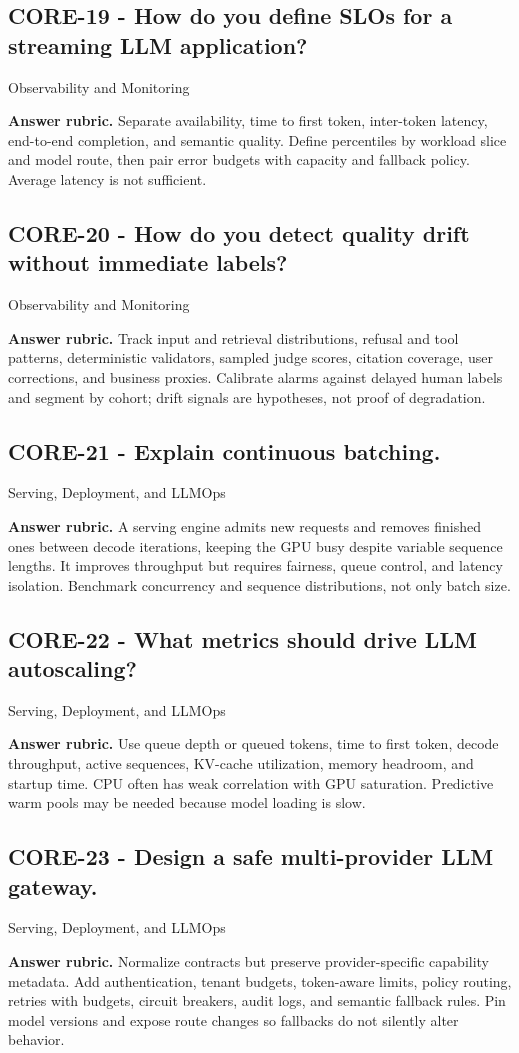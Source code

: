 \subsection*{CORE-19 - How do you define SLOs for a streaming LLM application?}
 \quad Observability and Monitoring
\par\smallskip\textbf{Answer rubric.} Separate availability, time to first token, inter-token latency, end-to-end completion, and semantic quality. Define percentiles by workload slice and model route, then pair error budgets with capacity and fallback policy. Average latency is not sufficient.
\subsection*{CORE-20 - How do you detect quality drift without immediate labels?}
 \quad Observability and Monitoring
\par\smallskip\textbf{Answer rubric.} Track input and retrieval distributions, refusal and tool patterns, deterministic validators, sampled judge scores, citation coverage, user corrections, and business proxies. Calibrate alarms against delayed human labels and segment by cohort; drift signals are hypotheses, not proof of degradation.
\subsection*{CORE-21 - Explain continuous batching.}
 \quad Serving, Deployment, and LLMOps
\par\smallskip\textbf{Answer rubric.} A serving engine admits new requests and removes finished ones between decode iterations, keeping the GPU busy despite variable sequence lengths. It improves throughput but requires fairness, queue control, and latency isolation. Benchmark concurrency and sequence distributions, not only batch size.
\subsection*{CORE-22 - What metrics should drive LLM autoscaling?}
 \quad Serving, Deployment, and LLMOps
\par\smallskip\textbf{Answer rubric.} Use queue depth or queued tokens, time to first token, decode throughput, active sequences, KV-cache utilization, memory headroom, and startup time. CPU often has weak correlation with GPU saturation. Predictive warm pools may be needed because model loading is slow.
\subsection*{CORE-23 - Design a safe multi-provider LLM gateway.}
 \quad Serving, Deployment, and LLMOps
\par\smallskip\textbf{Answer rubric.} Normalize contracts but preserve provider-specific capability metadata. Add authentication, tenant budgets, token-aware limits, policy routing, retries with budgets, circuit breakers, audit logs, and semantic fallback rules. Pin model versions and expose route changes so fallbacks do not silently alter behavior.
